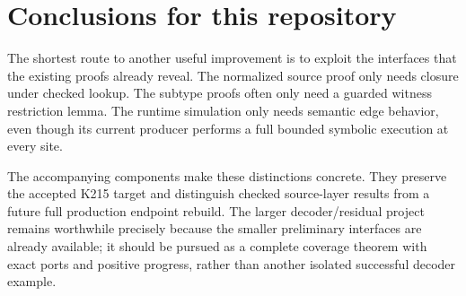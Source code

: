 \documentclass[11pt]{article}
\theoremstyle{remark}\newtheorem{remark}[theorem]{Remark}
\begin{document}


\section{Conclusions for this repository}
The shortest route to another useful improvement is to exploit the interfaces that the existing proofs already reveal. The normalized source proof only needs closure under checked lookup. The subtype proofs often only need a guarded witness restriction lemma. The runtime simulation only needs semantic edge behavior, even though its current producer performs a full bounded symbolic execution at every site.

The accompanying components make these distinctions concrete. They preserve the accepted K215 target and distinguish checked source-layer results from a future full production endpoint rebuild. The larger decoder/residual project remains worthwhile precisely because the smaller preliminary interfaces are already available; it should be pursued as a complete coverage theorem with exact ports and positive progress, rather than another isolated successful decoder example.
\end{document}
